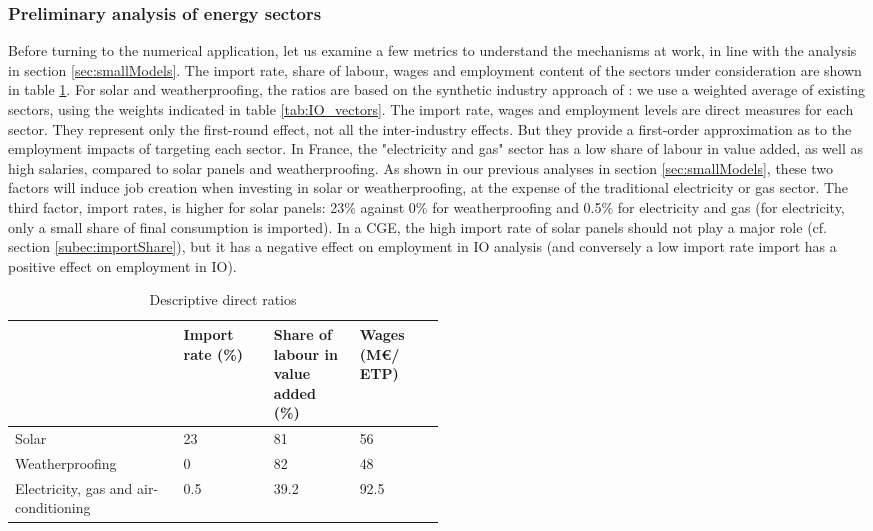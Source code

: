 \subsubsection{Preliminary analysis of energy sectors}
Before turning to the numerical application, let us examine a few metrics to understand the mechanisms at work, in line with the analysis in section \ref{sec:smallModels}. The import rate, share of labour, wages and employment content of the sectors under consideration are shown in table \ref{tab:descriptiveRatios}. 
For solar and weatherproofing, the ratios are based on the synthetic industry approach of \citet{Garrett2017}: we use a weighted average of existing sectors, using the weights indicated in table \ref{tab:IO_vectors}.
The import rate, wages and employment levels are direct measures for each sector. They represent only the first-round effect, not all the inter-industry effects. But they provide a first-order approximation as to the employment impacts of targeting each sector.
In France, the "electricity and gas" sector has a low share of labour in value added, as well as high salaries, compared to solar panels and weatherproofing. As shown in our previous analyses in section \ref{sec:smallModels}, these two factors will induce job creation when investing in solar or weatherproofing, at the expense of the traditional electricity or gas sector.
The third factor, import rates, is higher for solar panels: 23\% against 0\% for weatherproofing and 0.5\% for electricity and gas (for electricity, only a small share of final consumption is imported). In a CGE, the high import rate of solar panels should not play a major role (cf. section \ref{subec:importShare}), but it has a negative effect on employment in IO analysis (and conversely a low import rate import has a positive effect on employment in IO).

\begin{table}[!h]
	\centering
	\caption{Descriptive direct ratios}
	\label{tab:descriptiveRatios}
	\begin{tabular}{p{0.2\linewidth}p{0.1\linewidth}p{0.1\linewidth}p{0.1\linewidth}}
		\toprule
		& Import rate (\%) & Share of labour in value added (\%) & Wages (M\euro / ETP)  \\
		\midrule
		Solar & 23 & 81 & 56 \\
		Weatherproofing & 0 & 82 & 48 \\
		Electricity, gas and air-conditioning & 0.5 & 39.2 & 92.5 \\
		\bottomrule
	\end{tabular}
\end{table}


